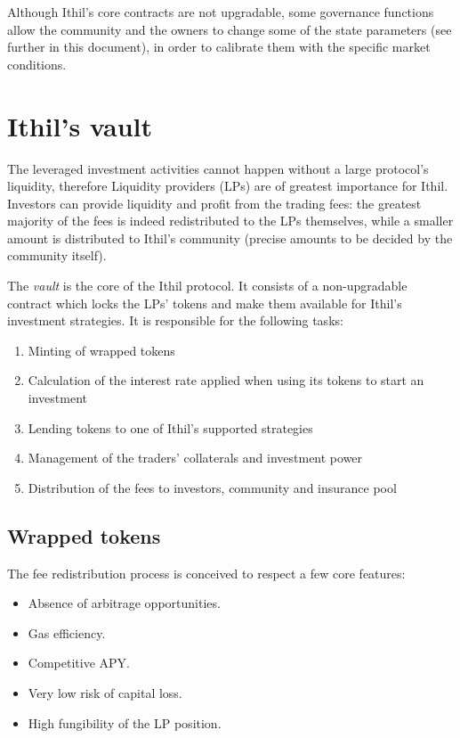 \documentclass [10pt, fancyhdr, twoside] {article}
\begin{document}
Although Ithil's core contracts are not upgradable, some governance functions allow the community and the owners to change some of the state parameters (see further in this document), in order to calibrate them with the specific market conditions.

\section{Ithil's vault}\label{LPSection}

The leveraged investment activities cannot happen without a large protocol's liquidity, therefore Liquidity providers (LPs) are of greatest importance for Ithil. Investors can provide liquidity and profit from the trading fees: the greatest majority of the fees is indeed redistributed to the LPs themselves, while a smaller amount is distributed to Ithil's community (precise amounts to be decided by the community itself).

The \textit{vault} is the core of the Ithil protocol. It consists of a non-upgradable contract which locks the LPs' tokens and make them available for Ithil's investment strategies. It is responsible for the following tasks:
\begin{enumerate}
\item Minting of wrapped tokens
\item Calculation of the interest rate applied when using its tokens to start an investment
\item Lending tokens to one of Ithil's supported strategies
\item Management of the traders' collaterals and investment power
\item Distribution of the fees to investors, community and insurance pool
\end{enumerate}

\subsection{Wrapped tokens}\label{wrappedTokenSubsection}

The fee redistribution process is conceived to respect a few core features:

\begin{itemize}
\item Absence of arbitrage opportunities.
\item Gas efficiency.
\item Competitive APY.
\item Very low risk of capital loss.
\item High fungibility of the LP position.
\end{itemize}
\end{document}
